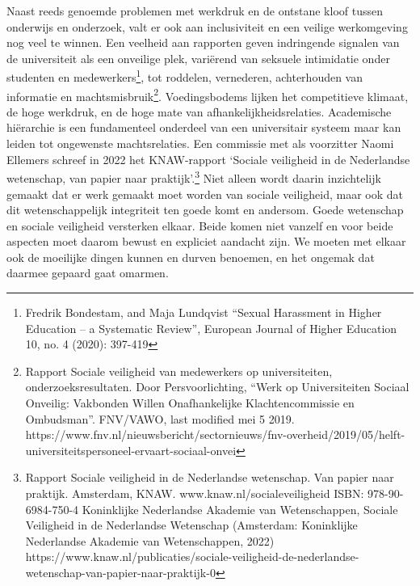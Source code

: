 \documentclass{jote-book}
\begin{document}
	Naast reeds genoemde problemen met werkdruk en de ontstane kloof tussen onderwijs en onderzoek, valt er ook aan inclusiviteit en een veilige werkomgeving nog veel te winnen. Een veelheid aan rapporten geven indringende signalen van de universiteit als een onveilige plek, variërend van seksuele intimidatie onder studenten en medewerkers\footnote{Fredrik Bondestam, and Maja Lundqvist “Sexual Harassment in Higher Education -- a Systematic Review”, European Journal of Higher Education 10, no. 4 (2020): 397-419}, tot roddelen, vernederen, achterhouden van informatie en machtsmisbruik\footnote{Rapport Sociale veiligheid van medewerkers op universiteiten, onderzoeksresultaten. Door Persvoorlichting, “Werk op Universiteiten Sociaal Onveilig: Vakbonden Willen Onafhankelijke Klachtencommissie en Ombudsman”. FNV/VAWO, last modified mei 5 2019. https://www.fnv.nl/nieuwsbericht/sectornieuws/fnv-overheid/2019/05/helft-universiteitspersoneel-ervaart-sociaal-onvei}. Voedingsbodems lijken het competitieve klimaat, de hoge werkdruk, en de hoge mate van afhankelijkheidsrelaties. Academische hiërarchie is een fundamenteel onderdeel van een universitair systeem maar kan leiden tot ongewenste machtsrelaties. Een commissie met als voorzitter Naomi Ellemers schreef in 2022 het KNAW-rapport ‘Sociale veiligheid in de Nederlandse wetenschap, van papier naar praktijk'.\footnote{Rapport Sociale veiligheid in de Nederlandse wetenschap. Van papier naar praktijk. Amsterdam, KNAW. www.knaw.nl/socialeveiligheid ISBN: 978-90-6984-750-4 Koninklijke Nederlandse Akademie van Wetenschappen, Sociale Veiligheid in de Nederlandse Wetenschap (Amsterdam: Koninklijke Nederlandse Akademie van Wetenschappen, 2022) https://www.knaw.nl/publicaties/sociale-veiligheid-de-nederlandse-wetenschap-van-papier-naar-praktijk-0} Niet alleen wordt daarin inzichtelijk gemaakt dat er werk gemaakt moet worden van sociale veiligheid, maar ook dat dit wetenschappelijk integriteit ten goede komt en andersom. Goede wetenschap en sociale veiligheid versterken elkaar. Beide komen niet vanzelf en voor beide aspecten moet daarom bewust en expliciet aandacht zijn. We moeten met elkaar ook de moeilijke dingen kunnen en durven benoemen, en het ongemak dat daarmee gepaard gaat omarmen.
\end{document}
